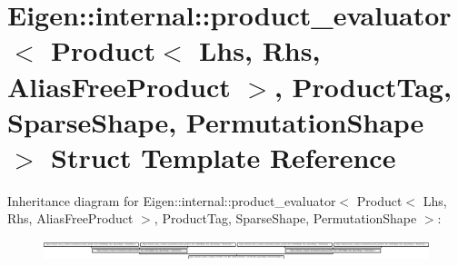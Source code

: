 \hypertarget{struct_eigen_1_1internal_1_1product__evaluator_3_01_product_3_01_lhs_00_01_rhs_00_01_alias_free_9d3be1aa43ce7749965c0caa1184b53c}{}\section{Eigen\+:\+:internal\+:\+:product\+\_\+evaluator$<$ Product$<$ Lhs, Rhs, Alias\+Free\+Product $>$, Product\+Tag, Sparse\+Shape, Permutation\+Shape $>$ Struct Template Reference}
\label{struct_eigen_1_1internal_1_1product__evaluator_3_01_product_3_01_lhs_00_01_rhs_00_01_alias_free_9d3be1aa43ce7749965c0caa1184b53c}
Inheritance diagram for Eigen\+:\+:internal\+:\+:product\+\_\+evaluator$<$ Product$<$ Lhs, Rhs, Alias\+Free\+Product $>$, Product\+Tag, Sparse\+Shape, Permutation\+Shape $>$\+:\begin{figure}[H]
\begin{center}
\leavevmode
\includegraphics[height=0.576132cm]{struct_eigen_1_1internal_1_1product__evaluator_3_01_product_3_01_lhs_00_01_rhs_00_01_alias_free_9d3be1aa43ce7749965c0caa1184b53c}
\end{center}
\end{figure}
